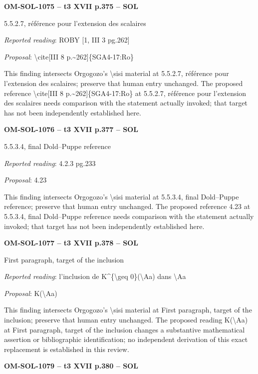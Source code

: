\par\noindent\textbf{OM-SOL-1075 -- t3 XVII p.375 -- SOL}\par
5.5.2.7, référence pour l'extension des scalaires\par
\emph{Reported reading}: ROBY [1, III 3 pg.262]\par
\emph{Proposal}: \textbackslash{}cite[III 8 p.\textasciitilde{}262]\{SGA4-17:Ro\}\par
This finding intersects Orgogozo's \textbackslash{}sisi material at 5.5.2.7, référence pour l'extension des scalaires; preserve that human entry unchanged. The proposed reference \textbackslash{}cite[III 8 p.\textasciitilde{}262]\{SGA4-17:Ro\} at 5.5.2.7, référence pour l'extension des scalaires needs comparison with the statement actually invoked; that target has not been independently established here.\par
\par\noindent\textbf{OM-SOL-1076 -- t3 XVII p.377 -- SOL}\par
5.5.3.4, final Dold–Puppe reference\par
\emph{Reported reading}: 4.2.3 pg.233\par
\emph{Proposal}: 4.23\par
This finding intersects Orgogozo's \textbackslash{}sisi material at 5.5.3.4, final Dold–Puppe reference; preserve that human entry unchanged. The proposed reference 4.23 at 5.5.3.4, final Dold–Puppe reference needs comparison with the statement actually invoked; that target has not been independently established here.\par
\par\noindent\textbf{OM-SOL-1077 -- t3 XVII p.378 -- SOL}\par
First paragraph, target of the inclusion\par
\emph{Reported reading}: l'inclusion de K\textasciicircum{}\{\textbackslash{}geq 0\}(\textbackslash{}Aa) dans \textbackslash{}Aa\par
\emph{Proposal}: K(\textbackslash{}Aa)\par
This finding intersects Orgogozo's \textbackslash{}sisi material at First paragraph, target of the inclusion; preserve that human entry unchanged. The proposed reading K(\textbackslash{}Aa) at First paragraph, target of the inclusion changes a substantive mathematical assertion or bibliographic identification; no independent derivation of this exact replacement is established in this review.\par
\par\noindent\textbf{OM-SOL-1079 -- t3 XVII p.380 -- SOL}\par
